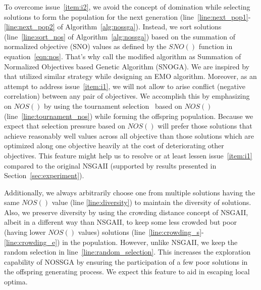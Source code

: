 To overcome issue~\ref{item:i2}, we avoid the concept of domination while selecting solutions to form the population for the next generation (line~\ref{line:next_pop1}-\ref{line:next_pop2} of Algorithm~\ref{alg:nossga}). Instead, we sort solutions (line~\ref{line:sort_nos} of Algorithm~\ref{alg:nossga}) based on the summation of normalized objective (SNO) values as defined by the $SNO()$ function in equation~\ref{eqn:nos}. That's why call the modified algorithm as Summation of Normalized Objectives based Genetic Algorithm (SNOGA). We are inspired by~\cite{qu2010multi} that utilized similar strategy while designing an EMO algorithm. Moreover, as an attempt to address issue~\ref{item:i1}, we will not allow to arise conflict (negative correlation) between any pair of objectives. We accomplish this by emphasizing on $NOS()$ by using the tournament selection~\cite{goldberg1991comparative} based on $NOS()$ (line~\ref{line:tournament_nos}) while forming the offspring population.
Because we expect that selection pressure based on $NOS()$ will prefer those solutions that achieve reasonably well values across all objective than those solutions which are optimized along one objective heavily at the cost of deteriorating other objectives. This feature might help us to resolve or at least lessen issue~\ref{item:i1} compared to the original NSGAII (supported by results presented in Section~\ref{sec:experiment}). %

Additionally, we always arbitrarily choose one from multiple solutions having the same $NOS()$ value (line \ref{line:diversity}) to maintain the diversity of solutions. Also, we preserve diversity by using the crowding distance concept of NSGAII, albeit in a different way than NSGAII, to keep some less crowded but poor (having lower $NOS()$ values) solutions (line~\ref{line:crowding_s}-\ref{line:crowding_e}) in the population. However, unlike NSGAII, we keep the random selection in line~\ref{line:random_selection}. This increases the exploration capability of NOSSGA by ensuring the participation of a few poor solutions in the offspring generating process. We expect this feature to aid in escaping local optima.



